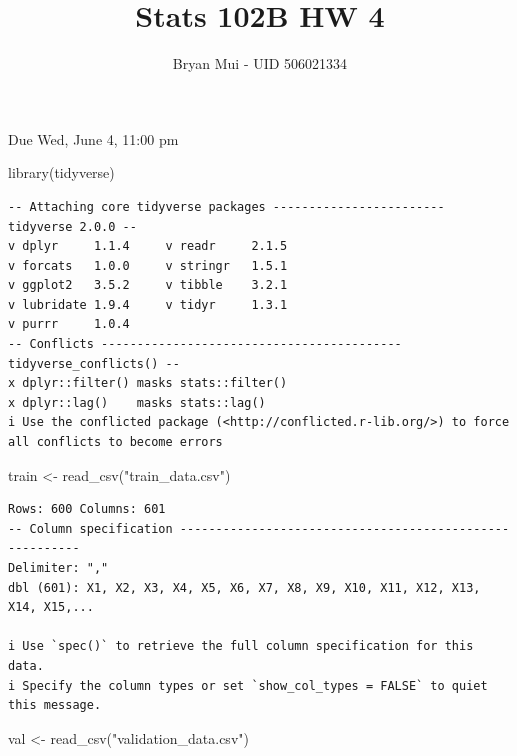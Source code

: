 \documentclass[
  letterpaper,
  DIV=11,
  numbers=noendperiod]{scrartcl}
\title{Stats 102B HW 4}
\author{Bryan Mui - UID 506021334}
\date{}
\newenvironment{Shaded}{\begin{snugshade}}{\end{snugshade}}
\newcommand{\FunctionTok}[1]{\textcolor[rgb]{0.28,0.35,0.67}{#1}}
\newcommand{\NormalTok}[1]{\textcolor[rgb]{0.00,0.23,0.31}{#1}}
\newcommand{\OtherTok}[1]{\textcolor[rgb]{0.00,0.23,0.31}{#1}}
\newcommand{\StringTok}[1]{\textcolor[rgb]{0.13,0.47,0.30}{#1}}
\begin{document}
\maketitle


Due Wed, June 4, 11:00 pm

\begin{Shaded}
\begin{Highlighting}[]
\FunctionTok{library}\NormalTok{(tidyverse)}
\end{Highlighting}
\end{Shaded}

\begin{verbatim}
-- Attaching core tidyverse packages ------------------------ tidyverse 2.0.0 --
v dplyr     1.1.4     v readr     2.1.5
v forcats   1.0.0     v stringr   1.5.1
v ggplot2   3.5.2     v tibble    3.2.1
v lubridate 1.9.4     v tidyr     1.3.1
v purrr     1.0.4     
-- Conflicts ------------------------------------------ tidyverse_conflicts() --
x dplyr::filter() masks stats::filter()
x dplyr::lag()    masks stats::lag()
i Use the conflicted package (<http://conflicted.r-lib.org/>) to force all conflicts to become errors
\end{verbatim}

\begin{Shaded}
\begin{Highlighting}[]
\NormalTok{train }\OtherTok{\textless{}{-}} \FunctionTok{read\_csv}\NormalTok{(}\StringTok{"train\_data.csv"}\NormalTok{)}
\end{Highlighting}
\end{Shaded}

\begin{verbatim}
Rows: 600 Columns: 601
-- Column specification --------------------------------------------------------
Delimiter: ","
dbl (601): X1, X2, X3, X4, X5, X6, X7, X8, X9, X10, X11, X12, X13, X14, X15,...

i Use `spec()` to retrieve the full column specification for this data.
i Specify the column types or set `show_col_types = FALSE` to quiet this message.
\end{verbatim}

\begin{Shaded}
\begin{Highlighting}[]
\NormalTok{val }\OtherTok{\textless{}{-}} \FunctionTok{read\_csv}\NormalTok{(}\StringTok{"validation\_data.csv"}\NormalTok{)}
\end{Highlighting}
\end{Shaded}
\end{document}
